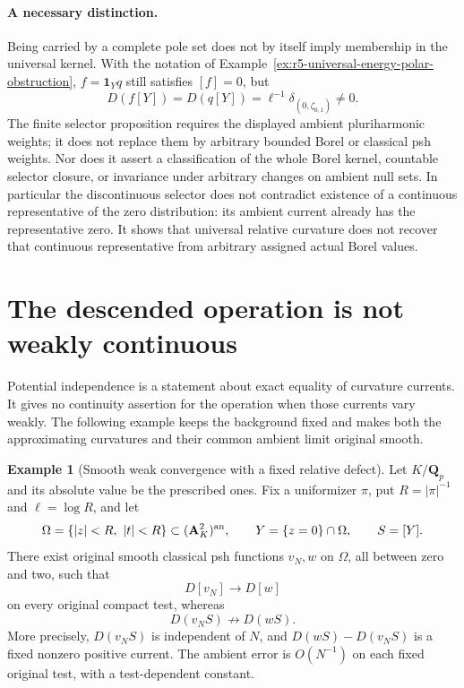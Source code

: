 \documentclass[11pt,a4paper]{article}
\numberwithin{equation}{section}
\theoremstyle{definition}
\newtheorem{example}[theorem]{Example}
\theoremstyle{remark}
\begin{document}
\paragraph{A necessary distinction.}
Being carried by a complete pole set does not by itself imply
membership in the universal kernel.  With the notation of
Example~\ref{ex:r5-universal-energy-polar-obstruction},
$f=\mathbf1_Yq$ still satisfies $[f]=0$, but
\[
                  D(f[Y])=D(q[Y])
                         =\ell^{-1}\delta_{(0,\zeta_{0,1})}\ne0.
\]
The finite selector proposition requires the displayed ambient
pluriharmonic weights; it does not replace them by arbitrary
bounded Borel or classical psh weights.  Nor does it assert a
classification of the whole Borel kernel, countable selector
closure, or invariance under arbitrary changes on ambient null
sets.  In particular the discontinuous selector does not
contradict existence of a continuous representative of the zero
distribution: its ambient current already has the representative
zero.  It shows that universal relative curvature does not
recover that continuous representative from arbitrary assigned
actual Borel values.



\section{The descended operation is not weakly continuous}
\label{sec:r5-weak-current-quotient-obstruction}

Potential independence is a statement about exact equality of
curvature currents. It gives no continuity assertion for the
operation when those currents vary weakly. The following example
keeps the background fixed and makes both the approximating
curvatures and their common ambient limit original smooth.

\begin{example}[Smooth weak convergence with a fixed relative defect]
\label{ex:r5-smooth-weak-current-defect}
Let $K/\mathbf Q_p$ and its absolute value be the prescribed ones.
Fix a uniformizer $\pi$, put $R=|\pi|^{-1}$ and
$\ell=\log R$, and let
\[
 \Omega=\{|z|<R,\ |t|<R\}\subset(\mathbf A_K^2)^{\rm an},
 \qquad Y=\{z=0\}\cap\Omega,\qquad S=[Y].
\]
There exist original smooth classical psh functions
$v_N,w$ on $\Omega$, all between zero and two, such that
\[
                  D[v_N]\longrightarrow D[w]
\]
on every original compact test, whereas
\[
        D(v_NS)\not\longrightarrow D(wS).
\]
More precisely, $D(v_NS)$ is independent of $N$, and
$D(wS)-D(v_NS)$ is a fixed nonzero positive current. The ambient
error is $O(N^{-1})$ on each fixed original test, with a
test-dependent constant.
\end{example}
\end{document}
